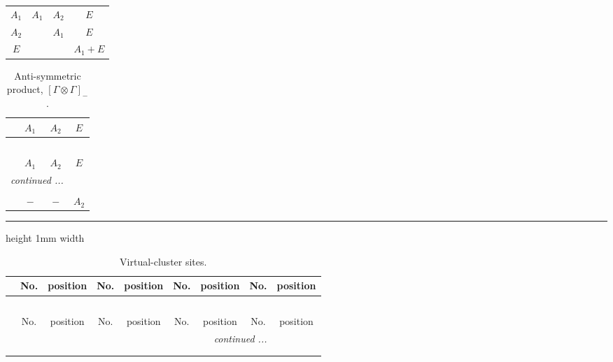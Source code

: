 \documentclass[fleqn,10pt,landscape]{article}
\begin{document}
\begin{itemize}
\begin{center}
\begin{longtable}{c|ccc}
$ A_{1} $ & $ A_{1} $ & $ A_{2} $ & $ E $ \\
$ A_{2} $ & $  $ & $ A_{1} $ & $ E $ \\
$ E $ & $  $ & $  $ & $ A_{1} + E $ \\
\end{longtable}
\end{center}
\begin{center}
\renewcommand{\arraystretch}{1.0}
\begin{longtable}{cccc}
\caption{Anti-symmetric product, $[\Gamma\otimes\Gamma]_-$.}
 \\
 \hline \hline
 & $ A_{1} $ & $ A_{2} $ & $ E $ \\ \hline \endfirsthead

\multicolumn{3}{l}{\tablename\ \thetable{}} \\
 \hline \hline
 & $ A_{1} $ & $ A_{2} $ & $ E $ \\ \hline \endhead

 \hline \hline
\multicolumn{3}{r}{\footnotesize\it continued ...} \\ \endfoot

 \hline \hline
\multicolumn{3}{r}{} \\ \endlastfoot

$  $ & $ - $ & $ - $ & $ A_{2} $ \\
\end{longtable}
\end{center}

 \hfil \hrule height 1mm width \textwidth \hfil

{
\scriptsize
\begin{center}
\renewcommand{\arraystretch}{1.7}
\begin{longtable}{ccccccccc}
\caption{Virtual-cluster sites.}
 \\
 \hline \hline
 & No. & position & No. & position & No. & position & No. & position \\ \hline \endfirsthead

\multicolumn{8}{l}{\tablename\ \thetable{}} \\
 \hline \hline
 & No. & position & No. & position & No. & position & No. & position \\ \hline \endhead

 \hline \hline
\multicolumn{8}{r}{\footnotesize\it continued ...} \\ \endfoot

 \hline \hline
\multicolumn{8}{r}{} \\ \endlastfoot


\end{longtable}
\end{center}}
\end{itemize}
\end{document}
